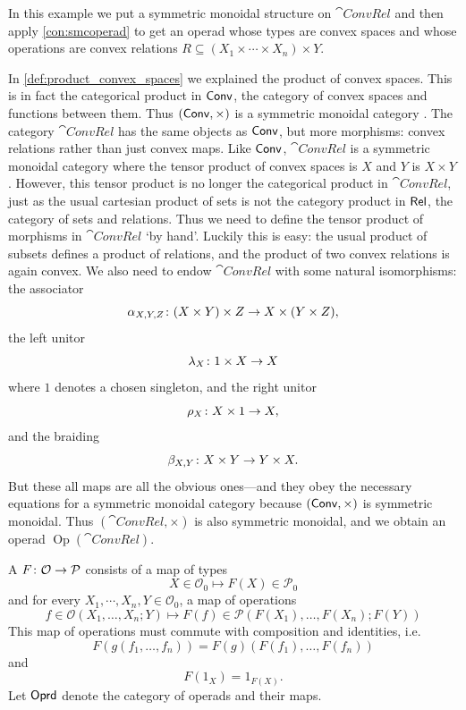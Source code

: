\documentclass[12pt, reqno]{amsart}
\renewcommand{\O}{\mathcal{O}}
\renewcommand{\P}{\mathcal{P}}
\DeclareMathOperator{\Op}{Op}
\newcommand{\convrelC}{\cat{ConvRel}}
\begin{document}
\begin{example}
    In this example we put a symmetric monoidal structure on $\convrelC$ and then apply \cref{con:smcoperad} to get an operad whose types are convex spaces and whose operations are convex relations $R \subseteq (X_1 \times \cdots \times X_n) \times Y$.
    
    In \cref{def:product_convex_spaces} we explained the product of convex spaces. This is in fact the categorical product in $\mathsf{Conv}$, the category of convex spaces and functions between them. Thus $(\mathsf{Conv}, \times)$ is a symmetric monoidal category \cite{MacLane}. The category $\convrelC$ has the same objects as $\mathsf{Conv}$, but more morphisms: convex relations rather than just convex maps. Like $\mathsf{Conv}$, $\convrelC$ is a symmetric monoidal category where the tensor product of convex spaces is $X$ and $Y$ is $X \times Y$. However, this tensor product is no longer the categorical product in $\convrelC$, just as the usual cartesian product of sets is not the category product in $\mathsf{Rel}$, the category of sets and relations. Thus we need to define the tensor product of morphisms in $\convrelC$ `by hand'. Luckily this is easy: the usual product of subsets defines a product of relations, and the product of two convex relations is again convex. We also need to endow $\convrelC$ with some natural isomorphisms: the associator
    \[   \alpha_{X,Y,Z} \colon (X \times Y) \times Z \rightarrow X \times (Y \times Z), \]
    the left unitor
    \[  \lambda_X \colon 1 \times X \rightarrow X \]
    where $1$ denotes a chosen singleton,
    and the right unitor
    \[   \rho_X \colon X \times 1 \rightarrow X , \]
    and the braiding
    \[   \beta_{X,Y} \colon X \times Y \rightarrow Y \times X .\]
    But these all maps are all the obvious ones---and they obey the necessary equations for a symmetric monoidal category because $(\mathsf{Conv}, \times)$ is symmetric monoidal. Thus $(\convrelC, \times)$ is also symmetric monoidal, and we obtain an operad $\Op(\convrelC)$.
\end{example}

\begin{definition}
    A  $F \maps \O \to \P$ consists of a map of types \[X \in \O_0 \mapsto F(X) \in \P_0\] and for every $X_1, \cdots, X_n, Y \in \O_0$, a map of operations \[f \in \O(X_1, \ldots, X_n; Y) \mapsto F(f) \in \P(F(X_1), \ldots, F(X_n); F(Y))\]
    This map of operations must commute with composition and identities, i.e.\ \[F(g(f_1, \ldots, f_n)) = F(g)(F(f_1), \ldots, F(f_n))\] and \[F(1_X) = 1_{F(X)}.\] Let $\mathsf{Oprd}$ denote the category of operads and their maps.
\end{definition}
\end{document}
